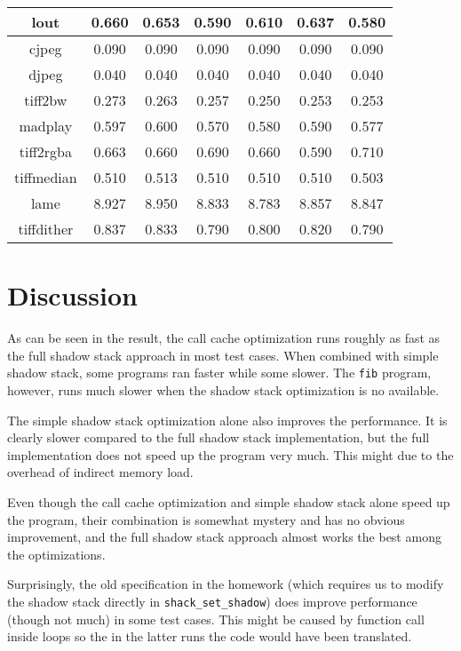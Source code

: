 \documentclass{article}
\begin{document}
\begin{center}
{\begin{tabular}{|c|c|c|c|c|c|c|}
    \hline
    lout & 0.660 & 0.653 & 0.590 & 0.610 & 0.637 & 0.580 \\
    \hline
    cjpeg & 0.090 & 0.090 & 0.090 & 0.090 & 0.090 & 0.090 \\
    \hline
    djpeg & 0.040 & 0.040 & 0.040 & 0.040 & 0.040 & 0.040 \\
    \hline
    tiff2bw & 0.273 & 0.263 & 0.257 & 0.250 & 0.253 & 0.253 \\
    \hline
    madplay & 0.597 & 0.600 & 0.570 & 0.580 & 0.590 & 0.577 \\
    \hline
    tiff2rgba & 0.663 & 0.660 & 0.690 & 0.660 & 0.590 & 0.710 \\
    \hline
    tiffmedian & 0.510 & 0.513 & 0.510 & 0.510 & 0.510 & 0.503 \\
    \hline
    lame & 8.927 & 8.950 & 8.833 & 8.783 & 8.857 & 8.847 \\
    \hline
    tiffdither & 0.837 & 0.833 & 0.790 & 0.800 & 0.820 & 0.790 \\
    \hline
  \end{tabular}}
\end{center}
\section{Discussion}
As can be seen in the result, the call cache optimization runs roughly as fast as the full shadow stack approach in most test cases. When combined with simple shadow stack, some programs ran faster while some slower. The \texttt{fib} program, however, runs much slower when the shadow stack optimization is no available.

The simple shadow stack optimization alone also improves the performance. It is clearly slower compared to the full shadow stack implementation, but the full implementation does not speed up the program very much. This might due to the overhead of indirect memory load.

Even though the call cache optimization and simple shadow stack alone speed up the program, their combination is somewhat mystery and has no obvious improvement, and the full shadow stack approach almost works the best among the optimizations.

Surprisingly, the old specification in the homework (which requires us to modify the shadow stack directly in \texttt{shack\_set\_shadow}) does improve performance (though not much) in some test cases. This might be caused by function call inside loops so the in the latter runs the code would have been translated.
\end{document}
